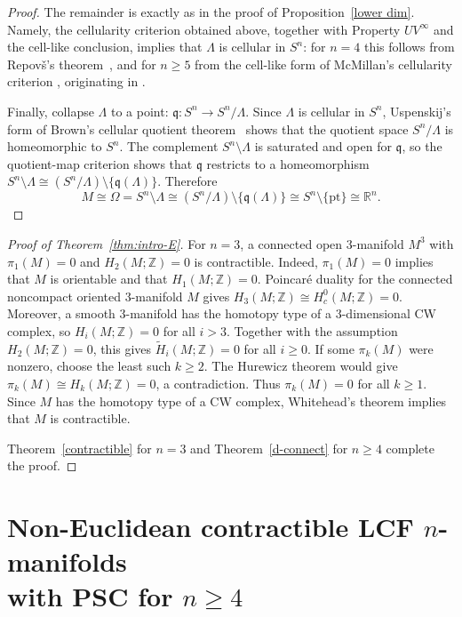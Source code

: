 \documentclass[12pt,oneside,a4paper]{article}
\theoremstyle{mytheorem}
\theoremstyle{remark}
\theoremstyle{definition}
\begin{document}
\begin{proof}
The remainder is exactly as in the proof of Proposition~\ref{lower dim}. Namely,
the cellularity criterion obtained above, together with Property
\(UV^\infty\) and the cell-like conclusion, implies that \(\Lambda\) is
cellular in \(S^n\): for \(n=4\) this
follows from Repov\v{s}'s theorem~\cite[Theorem, p.~564]{zbMATH04011439}, and for \(n\ge 5\)
from the cell-like form of McMillan's cellularity criterion
\cite[Theorem~3.2.3, p.~107]{zbMATH05624618}, originating in
\cite[Theorem~1, p.~327]{zbMATH03190942}.

Finally, collapse \(\Lambda\) to a point:
\(\mathfrak q\colon S^n\to S^n/\Lambda\).
Since \(\Lambda\) is cellular in \(S^n\), Uspenskij's form of Brown's
cellular quotient theorem~\cite[Theorem~1.3]{zbMATH05002651} shows that the
quotient space \(S^n/\Lambda\) is homeomorphic to \(S^n\). The complement
\(S^n\setminus\Lambda\) is saturated and open for \(\mathfrak q\), so the
quotient-map criterion shows that \(\mathfrak q\) restricts to a homeomorphism
\(S^n\setminus\Lambda \cong
(S^n/\Lambda)\setminus\{\mathfrak q(\Lambda)\}.\)
Therefore
\[
M\cong \Omega=S^n\setminus\Lambda
\cong
(S^n/\Lambda)\setminus\{\mathfrak q(\Lambda)\}
\cong
S^n\setminus\{\mathrm{pt}\}
\cong
\mathbb R^n .
\]
\end{proof}

\begin{proof}[Proof of Theorem~\ref{thm:intro-E}]
For \(n=3\), a connected open \(3\)-manifold \(M^3\) with
\(\pi_1(M)=0\) and \(H_2(M;\mathbb Z)=0\) is contractible. Indeed,
\(\pi_1(M)=0\) implies that \(M\) is orientable and that
\(H_1(M;\mathbb Z)=0\). Poincar\'e duality for the connected noncompact
oriented \(3\)-manifold \(M\) gives
\(H_3(M;\mathbb Z)\cong H_c^0(M;\mathbb Z)=0\).
Moreover, a smooth \(3\)-manifold has the homotopy type of a
\(3\)-dimensional CW complex, so \(H_i(M;\mathbb Z)=0\) for all \(i>3\).
Together with the assumption
\(H_2(M;\mathbb Z)=0\), this gives
\(\widetilde H_i(M;\mathbb Z)=0\) for all \(i\geq0\). If some
\(\pi_k(M)\) were nonzero, choose the least such \(k\geq2\). The Hurewicz
theorem would give \(\pi_k(M)\cong H_k(M;\mathbb Z)=0\), a contradiction.
Thus \(\pi_k(M)=0\) for all \(k\geq1\). Since \(M\) has the homotopy type of
a CW complex, Whitehead's theorem implies that
\(M\) is contractible.

Theorem~\ref{contractible} for \(n=3\) and Theorem~\ref{d-connect} for
\(n\geq4\) complete the proof.
\end{proof}



\section[Non-Euclidean contractible LCF manifolds with PSC]{\texorpdfstring{Non-Euclidean contractible LCF $n$-manifolds\\ with PSC for $n\geq 4$}{Non-Euclidean contractible LCF n-manifolds with PSC for n >= 4}}\label{counterexample psc}
\end{document}

